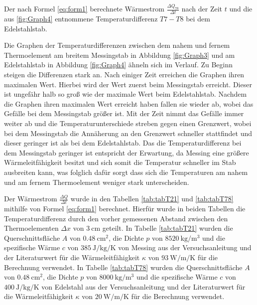 \begin{table}
	\centering
	\caption{Der nach Formel \eqref{eq:form1} berechnete Wärmestrom $\frac{\Delta Q_{78}}{\Delta t}$ nach der Zeit $t$ und die aus \ref{fig:Graph4} entnommene Temperaturdifferenz $T7-T8$ bei dem Edelstahlstab.}
	
\end{table}
Die Graphen der Temperaturdifferenzen zwischen dem nahem und fernem Thermoelement am breitem Messingstab in Abbildung \ref{fig:Graph3} und am Edelstahlstab in Abbildung \ref{fig:Graph4} ähneln sich im Verlauf. Zu Beginn steigen die Differenzen stark an. Nach einiger Zeit erreichen die Graphen ihren maximalen Wert. Hierbei wird der Wert zuerst beim Messingstab erreicht. Dieser ist ungefähr halb so groß wie der maximale Wert beim Edelstahlstab. Nachdem die Graphen ihren maximalen Wert erreicht haben fallen sie wieder ab, wobei das Gefälle bei dem Messingstab größer ist. Mit der Zeit nimmt das Gefälle immer weiter ab und die Temperaturunterschiede streben gegen einen Grenzwert, wobei bei dem Messingstab die Annäherung an den Grenzwert schneller stattfindet und dieser geringer ist als bei dem Edelstahlstab. Das die Temperaturdifferenz bei dem Messingstab geringer ist entspricht der Erwartung, da Messing eine größere Wärmeleitfähigkeit besitzt und sich somit die Temperatur schneller im Stab ausbreiten kann, was folglich dafür sorgt dass sich die Temperaturen am nahem und am fernem Thermoelement weniger stark unterscheiden.

Der Wärmestrom $\frac{\Delta Q}{\Delta t}$ wurde in den Tabellen \ref{tab:tabT21} und \ref{tab:tabT78} mithilfe von Formel \eqref{eq:form1} berechnet. Hierfür wurde in beiden Tabellen die Temperaturdifferenz durch den vorher gemessenen Abstand zwischen den Thermoelementen $\Delta x$ von $\SI{3}{\centi\meter}$ geteilt. In Tabelle \ref{tab:tabT21} wurden die Querschnittsfläche $A$ von $\SI{0.48}{\centi\meter\squared}$, die Dichte $p$ von $\SI{8520}{\kilo\gram\per\meter\tothe{3}}$ und die spezifische Wärme $c$ von $\SI{385}{\joule\per\kilo\gram\per\kelvin}$ von Messing aus der Versuchsanleitung \cite{V204} und der Literaturwert für die Wärmeleitfähigkeit $\kappa$ von $\SI{93}{\watt\per\meter\per\kelvin}$ \cite{??} für die Berechnung verwendet.
In Tabelle \ref{tab:tabT78} wurden die Querschnittsfläche $A$ von $\SI{0.48}{\centi\meter\squared}$, die Dichte $p$ von $\SI{8000}{\kilo\gram\per\meter\tothe{3}}$ und die spezifische Wärme $c$ von $\SI{400}{\joule\per\kilo\gram\per\kelvin}$ von Edelstahl aus der Versuchsanleitung \cite{V204} und der Literaturwert für die Wärmeleitfähigkeit $\kappa$ von $\SI{20}{\watt\per\meter\per\kelvin}$ \cite{??} für die Berechnung verwendet. 
